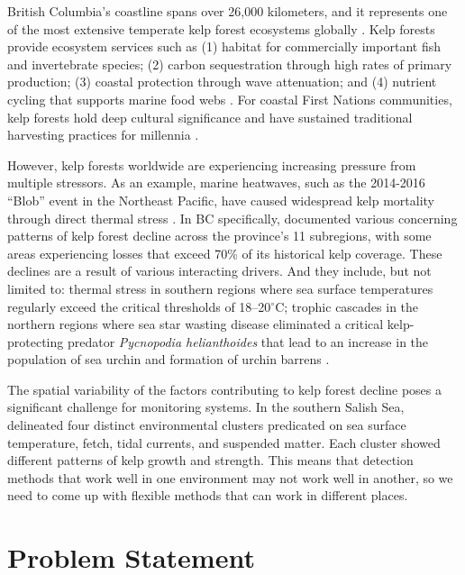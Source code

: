 \documentclass[12pt,oneside]{book}
\begin{document}
British Columbia's coastline spans over 26,000 kilometers, and it represents one of the most extensive temperate kelp forest ecosystems globally \citep{Starko2024}. Kelp forests provide ecosystem services such as (1) habitat for commercially important fish and invertebrate species; (2) carbon sequestration through high rates of primary production; (3) coastal protection through wave attenuation; and (4) nutrient cycling that supports marine food webs \citep{Krumhansl2016}. For coastal First Nations communities, kelp forests hold deep cultural significance and have sustained traditional harvesting practices for millennia \citep{Kobluk2021, Dillehay2008, Erlandson2007, Turner2001}.

However, kelp forests worldwide are experiencing increasing pressure from multiple stressors. As an example, marine heatwaves, such as the 2014-2016 ``Blob'' event in the Northeast Pacific, have caused widespread kelp mortality through direct thermal stress \citep{Cavanaugh2019, MoraSoto2024}. In BC specifically, \citet{Starko2024} documented various concerning patterns of kelp forest decline across the province's 11 subregions, with some areas experiencing losses that exceed 70\% of its historical kelp coverage. These declines are a result of various interacting drivers. And they include, but not limited to: thermal stress in southern regions where sea surface temperatures regularly exceed the critical thresholds of 18--20$^\circ$C; trophic cascades in the northern regions where sea star wasting disease eliminated a critical kelp-protecting predator \textit{Pycnopodia helianthoides} that lead to an increase in the population of sea urchin and formation of urchin barrens \citep{Hamilton2021, Burt2018}.

The spatial variability of the factors contributing to kelp forest decline poses a significant challenge for monitoring systems.  In the southern Salish Sea, \citet{MoraSoto2024} delineated four distinct environmental clusters predicated on sea surface temperature, fetch, tidal currents, and suspended matter.  Each cluster showed different patterns of kelp growth and strength.  This means that detection methods that work well in one environment may not work well in another, so we need to come up with flexible methods that can work in different places.

\section{Problem Statement}
\label{sec:problem}
\end{document}
